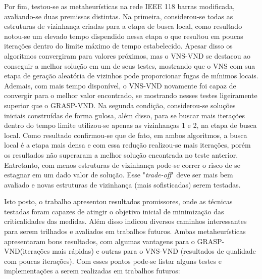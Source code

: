 \documentclass[12pt]{article}
\begin{document}
Por fim, testou-se as metaheurísticas na rede IEEE 118 barras modificada, avaliando-se duas premissas distintas. Na primeira, considerou-se todas as estruturas de vizinhança criadas para a etapa de busca local, como resultado notou-se um elevado tempo dispendido nessa etapa o que resultou em poucas iterações dentro do limite máximo de tempo estabelecido. Apesar disso os algoritmos convergiram para valores próximos, mas o VNS-VND se destacou ao conseguir a melhor solução em um de seus testes, mostrando que o VNS com sua etapa de geração aleatória de vizinhos pode proporcionar fugas de mínimos locais. Ademais, com mais tempo disponível, o VNS-VND novamente foi capaz de convergir para o melhor valor encontrado, se mostrando nesses testes ligeiramente superior que o GRASP-VND. Na segunda condição, considerou-se soluções iniciais construídas de forma gulosa, além disso, para se buscar mais iterações dentro do tempo limite utilizou-se apenas as vizinhanças 1 e 2, na etapa de busca local. Como resultado confirmou-se que de fato, em ambos algoritmos, a busca local é a etapa mais densa e com essa redução realizou-se mais iterações, porém os resultados não superaram a melhor solução encontrada no teste anterior. Entretanto, com menos estruturas de vizinhança pode-se correr o risco de se estagnar em um dado valor de solução. Esse "\textit{trade-off}" deve ser mais bem avaliado e novas estruturas de vizinhança (mais sofisticadas) serem testadas.

Isto posto, o trabalho apresentou resultados promissores, onde as técnicas testadas foram capazes de atingir o objetivo inicial de minimização das criticalidades das medidas. Além disso indicou diversos caminhos interessantes para serem trilhados e avaliados em trabalhos futuros. Ambas metaheurísticas apresentaram bons resultados, com algumas vantagens para o GRASP-VND(iterações mais rápidas) e outras para o VNS-VND (resultados de qualidade com poucas iterações). Com esses pontos pode-se listar alguns testes e implementações a serem realizadas em trabalhos futuros:
\end{document}
